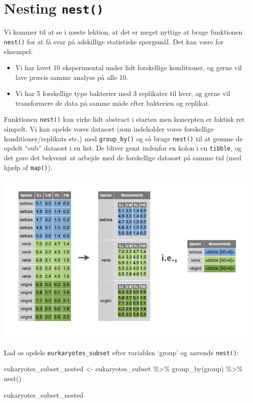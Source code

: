 \documentclass[
]{book}
\newenvironment{Shaded}{\begin{snugshade}}{\end{snugshade}}
\newcommand{\FunctionTok}[1]{\textcolor[rgb]{0.00,0.00,0.00}{#1}}
\newcommand{\NormalTok}[1]{#1}
\newcommand{\OtherTok}[1]{\textcolor[rgb]{0.56,0.35,0.01}{#1}}
\newcommand{\SpecialCharTok}[1]{\textcolor[rgb]{0.00,0.00,0.00}{#1}}
\providecommand{\tightlist}{%
  \setlength{\itemsep}{0pt}\setlength{\parskip}{0pt}}
\begin{document}
\hypertarget{nesting-nest}{%
\section{\texorpdfstring{Nesting \texttt{nest()}}{Nesting nest()}}\label{nesting-nest}}

Vi kommer til at se i næste lektion, at det er meget nyttige at bruge funktionen \texttt{nest()} for at få svar på adskillige statistiske spørgsmål. Det kan være for eksempel:

\begin{itemize}
\tightlist
\item
  Vi har lavet 10 eksperimental under lidt forskellige konditioner, og gerne vil lave præcis samme analyse på alle 10.
\item
  Vi har 5 forskellige type bakterier med 3 replikater til hver, og gerne vil transformere de data på samme måde efter bakterien og replikat.
\end{itemize}

Funktionen \texttt{nest()} kan virke lidt abstract i starten men koncepten er faktisk ret simpelt. Vi kan opelde vores datasæt (som indeholder vores forskellige konditioner/replikats etc.) med \texttt{group\_by()} og så bruge \texttt{nest()} til at gemme de opdelt ``sub'' datasæt i en list. De bliver gemt indenfor en kolon i en \texttt{tibble}, og det gøre det bekvemt at arbejde med de forskellige datasæt på samme tid (med hjælp af \texttt{map()}).

\includegraphics[width=1\linewidth]{plots/tidyr-nest}

Lad os opdele \texttt{eurkaryotes\_subset} efter variablen `group' og anvende \texttt{nest()}:

\begin{Shaded}
\begin{Highlighting}[]
\NormalTok{eukaryotes\_subset\_nested }\OtherTok{\textless{}{-}}\NormalTok{ eukaryotes\_subset }\SpecialCharTok{\%\textgreater{}\%} 
  \FunctionTok{group\_by}\NormalTok{(group) }\SpecialCharTok{\%\textgreater{}\%} 
  \FunctionTok{nest}\NormalTok{()}

\NormalTok{eukaryotes\_subset\_nested}
\end{Highlighting}
\end{Shaded}
\end{document}
